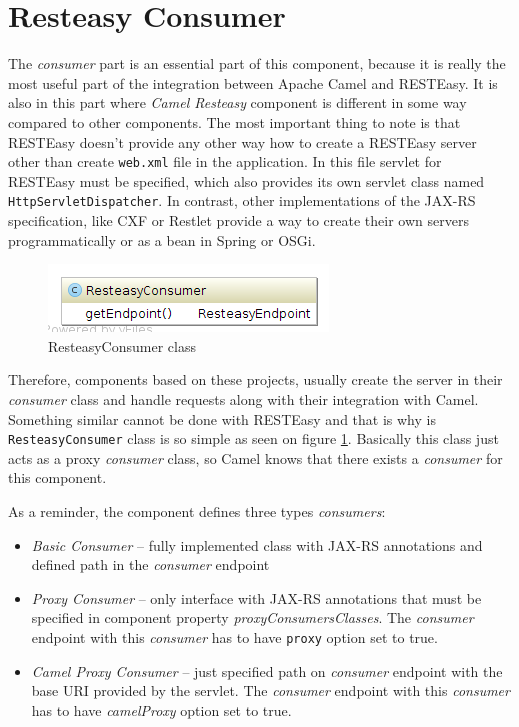 \documentclass[12pt,final,oneside]{fithesis2}
\begin{document}
\section{Resteasy Consumer}\label{consumer}
The \textit{consumer} part is an essential part of this component, because it is really the most useful part of the integration between Apache Camel and RESTEasy. It is also in this part where \textit{Camel Resteasy} component is different in some way compared to other components. The most important thing to note is that RESTEasy doesn't provide any other way how to create a RESTEasy server other than create \texttt{web.xml} file in the application. In this file  servlet for RESTEasy must be specified, which also provides its own servlet class named \texttt{HttpServletDispatcher}. In contrast, other implementations of the JAX-RS specification, like CXF or Restlet provide a way to create their own servers programmatically or as a bean in Spring or OSGi.

\begin{figure}[!h]
\centering
\includegraphics[width=0.6\linewidth]{images/consumer.png}
\caption{ResteasyConsumer class}
\label{fig-consumer}
\end{figure}

Therefore, components based on these projects, usually create the server in their \textit{consumer} class and handle requests along with their integration with Camel. Something similar cannot be done with RESTEasy and that is why is \texttt{ResteasyConsumer} class is so simple as seen on figure \ref{fig-consumer}. Basically this class just acts as a proxy \textit{consumer} class, so Camel knows that there exists a \textit{consumer} for this component.

As a reminder, the component defines three types \textit{consumers}:
\begin{itemize}
\item
\textit{Basic Consumer} -- fully implemented class with JAX-RS annotations and defined path in the \textit{consumer} endpoint

\item
\textit{Proxy Consumer} -- only interface with JAX-RS annotations that must be specified in component property \textit{proxyConsumersClass\-es}. The \textit{consumer} endpoint with this \textit{consumer} has to have \texttt{proxy} option set to true. 

\item
\textit{Camel Proxy Consumer} -- just specified path on \textit{consumer} endpoint with the base URI provided by the servlet. The \textit{consumer} endpoint with this \textit{consumer} has to have \textit{camelProxy} option set to true. 
\end{itemize}
\end{document}

